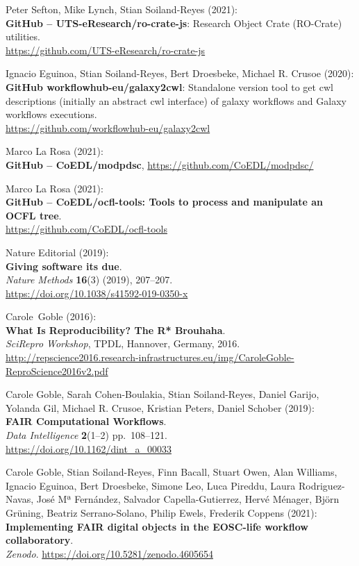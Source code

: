\begin{thebibliography}{9}
Peter Sefton, Mike Lynch, Stian Soiland-Reyes (2021):\\
\textbf{GitHub -- UTS-eResearch/ro-crate-js}: Research Object Crate
(RO-Crate) utilities.\\
\url{https://github.com/UTS-eResearch/ro-crate-js}

Ignacio Eguinoa, Stian Soiland-Reyes, Bert Droesbeke, Michael
R. Crusoe (2020):\\
\textbf{GitHub workflowhub-eu/galaxy2cwl}: Standalone version tool to
get cwl descriptions (initially an abstract cwl interface) of galaxy
workflows and Galaxy workflows executions.\\
\url{https://github.com/workflowhub-eu/galaxy2cwl}

Marco La Rosa (2021):\\
\textbf{GitHub -- CoEDL/modpdsc},
\url{https://github.com/CoEDL/modpdsc/}

Marco La Rosa (2021):\\
\textbf{GitHub -- CoEDL/ocfl-tools: Tools to process and manipulate an OCFL tree}.\\
\url{https://github.com/CoEDL/ocfl-tools}

Nature Editorial (2019):\\
\textbf{Giving software its due}.\\
\emph{Nature Methods} \textbf{16}(3) (2019), 207--207.\\
\url{https://doi.org/10.1038/s41592-019-0350-x}

Carole~Goble (2016):\\
\textbf{What Is Reproducibility? The R* Brouhaha}.\\
\emph{SciRepro Workshop}, TPDL, Hannover, Germany, 2016.
\url{http://repscience2016.research-infrastructures.eu/img/CaroleGoble-ReproScience2016v2.pdf}

Carole Goble, Sarah Cohen-Boulakia, Stian Soiland-Reyes, Daniel
Garijo, Yolanda Gil, Michael R. Crusoe, Kristian Peters, Daniel Schober
(2019):\\
\textbf{FAIR Computational Workflows}.\\
\emph{Data Intelligence} \textbf{2}(1--2) pp.~108--121.\\
\url{https://doi.org/10.1162/dint_a_00033}

Carole Goble, Stian Soiland-Reyes, Finn Bacall, Stuart Owen,
Alan Williams, Ignacio Eguinoa, Bert Droesbeke, Simone Leo, Luca
Pireddu, Laura Rodriguez-Navas, José Mª Fernández, Salvador
Capella-Gutierrez, Hervé Ménager, Björn Grüning, Beatriz Serrano-Solano,
Philip Ewels, Frederik Coppens (2021):\\
\textbf{Implementing FAIR digital objects in the EOSC-life workflow
collaboratory}.\\
\emph{Zenodo}. \url{https://doi.org/10.5281/zenodo.4605654}


\end{thebibliography}
